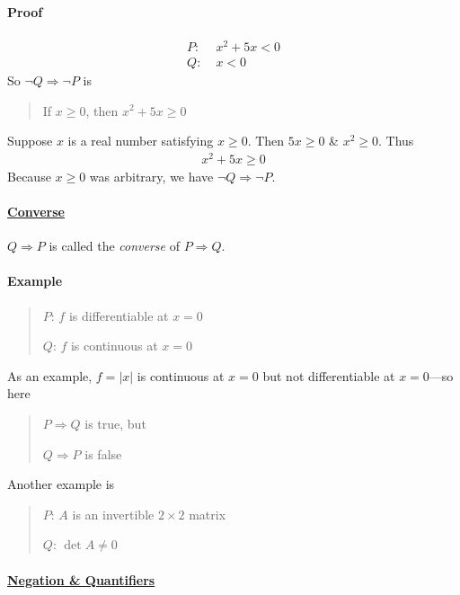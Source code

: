 \documentclass[../main.tex]{subfiles}
\begin{document}
\paragraph{Proof}

\begin{align*}
    P:& \; x^2 + 5x < 0 \\
    Q:& \; x < 0
\end{align*}
So $\neg Q \Rightarrow \neg P$ is
\begin{quote}
    If $x \geq 0$, then $x^2 + 5x \geq 0$
\end{quote}
Suppose $x$ is a real number satisfying $x \geq 0$. Then $5x \geq 0$ \& $x^2 \geq 0$. Thus
\begin{align*}
    x^2 + 5x \geq 0
\end{align*}
Because $x \geq 0$ was arbitrary, we have $\neg Q \Rightarrow \neg P$.

\paragraph{\underline{Converse}}

$Q \Rightarrow P$ is called the \emph{converse} of $P \Rightarrow Q$.

\paragraph{Example}

\begin{quote}
    $P$: $f$ is differentiable at $x = 0$

    $Q$: $f$ is continuous at $x = 0$
\end{quote}

As an example, $f = |x|$ is continuous at $x = 0$ but not differentiable at $x = 0$---so here
\begin{quotation}
    $P \Rightarrow Q$ is true, but

    $Q \Rightarrow P$ is false
\end{quotation}
Another example is
\begin{quotation}
    $P$: $A$ is an invertible $2 \times 2$ matrix

    $Q$: $\det A \neq 0$
\end{quotation}

\newpage
\paragraph{\underline{Negation \& Quantifiers}}
\end{document}
